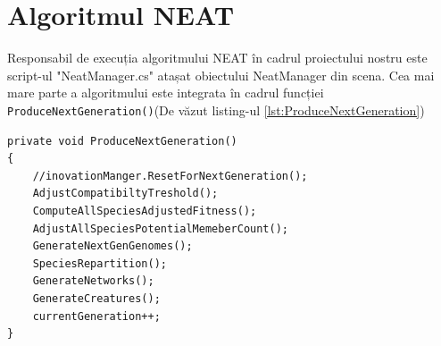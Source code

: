 \section{Algoritmul NEAT}
Responsabil de execuția algoritmului NEAT în cadrul proiectului nostru este script-ul "NeatManager.cs" atașat obiectului NeatManager din scena.
Cea mai mare parte a algoritmului este integrata în cadrul funcției \texttt{Produce\-Next\-Generation()}(De văzut listing-ul \ref{lst:ProduceNextGeneration})

\begin{lstlisting}[caption={Generarea urmatoarei generatii}, label={lst:ProduceNextGeneration}]
private void ProduceNextGeneration()
{
    //inovationManger.ResetForNextGeneration();
    AdjustCompatibiltyTreshold();
    ComputeAllSpeciesAdjustedFitness();
    AdjustAllSpeciesPotentialMemeberCount();
    GenerateNextGenGenomes();
    SpeciesRepartition();
    GenerateNetworks();
    GenerateCreatures();
    currentGeneration++;
}
\end{lstlisting}

